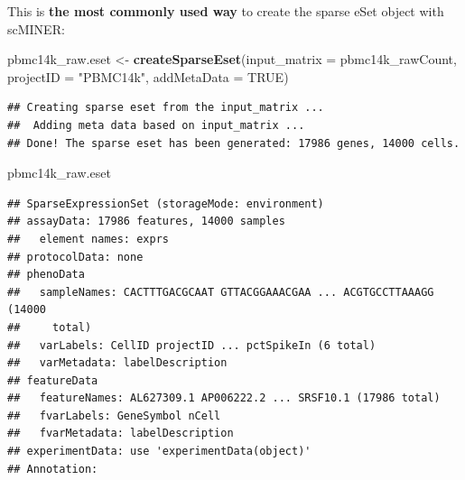 \documentclass[
  12pt,
]{book}
\newenvironment{Shaded}{\begin{snugshade}}{\end{snugshade}}
\newcommand{\AttributeTok}[1]{\textcolor[rgb]{0.13,0.29,0.53}{#1}}
\newcommand{\ConstantTok}[1]{\textcolor[rgb]{0.56,0.35,0.01}{#1}}
\newcommand{\FunctionTok}[1]{\textcolor[rgb]{0.13,0.29,0.53}{\textbf{#1}}}
\newcommand{\NormalTok}[1]{#1}
\newcommand{\OtherTok}[1]{\textcolor[rgb]{0.56,0.35,0.01}{#1}}
\newcommand{\StringTok}[1]{\textcolor[rgb]{0.31,0.60,0.02}{#1}}
\begin{document}
This is \textbf{the most commonly used way} to create the sparse eSet object with scMINER:

\begin{Shaded}
\begin{Highlighting}[]
\NormalTok{pbmc14k\_raw.eset }\OtherTok{\textless{}{-}} \FunctionTok{createSparseEset}\NormalTok{(}\AttributeTok{input\_matrix =}\NormalTok{ pbmc14k\_rawCount, }\AttributeTok{projectID =} \StringTok{"PBMC14k"}\NormalTok{, }\AttributeTok{addMetaData =} \ConstantTok{TRUE}\NormalTok{)}
\end{Highlighting}
\end{Shaded}

\begin{verbatim}
## Creating sparse eset from the input_matrix ...
##  Adding meta data based on input_matrix ...
## Done! The sparse eset has been generated: 17986 genes, 14000 cells.
\end{verbatim}

\begin{Shaded}
\begin{Highlighting}[]
\NormalTok{pbmc14k\_raw.eset}
\end{Highlighting}
\end{Shaded}

\begin{verbatim}
## SparseExpressionSet (storageMode: environment)
## assayData: 17986 features, 14000 samples 
##   element names: exprs 
## protocolData: none
## phenoData
##   sampleNames: CACTTTGACGCAAT GTTACGGAAACGAA ... ACGTGCCTTAAAGG (14000
##     total)
##   varLabels: CellID projectID ... pctSpikeIn (6 total)
##   varMetadata: labelDescription
## featureData
##   featureNames: AL627309.1 AP006222.2 ... SRSF10.1 (17986 total)
##   fvarLabels: GeneSymbol nCell
##   fvarMetadata: labelDescription
## experimentData: use 'experimentData(object)'
## Annotation:
\end{verbatim}
\end{document}
